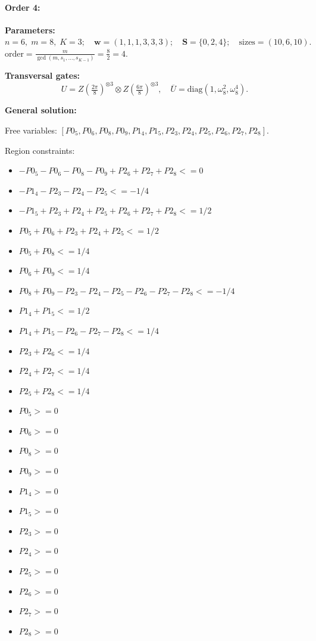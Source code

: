 \documentclass[11pt]{article}
\begin{document}
\paragraph{\textbf{Order 4:}}
\noindent\textbf{Parameters:} $n=6,\; m=8,\; K=3;\quad \mathbf w=(1, 1, 1, 3, 3, 3);\quad \mathbf S=\{0, 2, 4\};\quad \text{sizes}=\left(10, 6, 10\right).$ $\displaystyle \text{order}=\frac{m}{\gcd(m,s_1,\dots,s_{K-1})}=\frac{8}{2}=4.$

\noindent\textbf{Transversal gates:}
\[
    U=Z \left(\tfrac{2\pi}{8}\right)^{\otimes3} \otimes Z \left(\tfrac{6\pi}{8}\right)^{\otimes3},\quad
    \overline U=\mathrm{diag}(1,\omega_8^{2},\omega_8^{4}).
\]

\noindent\textbf{General solution:}

Free variables: $[P0_5, P0_6, P0_8, P0_9, P1_4, P1_5, P2_3, P2_4, P2_5, P2_6, P2_7, P2_8]$.

Region constraints:
\begin{itemize}
    \item $-P0_5 - P0_6 - P0_8 - P0_9 + P2_6 + P2_7 + P2_8 <= 0$
    \item $-P1_4 - P2_3 - P2_4 - P2_5 <= -1/4$
    \item $-P1_5 + P2_3 + P2_4 + P2_5 + P2_6 + P2_7 + P2_8 <= 1/2$
    \item $P0_5 + P0_6 + P2_3 + P2_4 + P2_5 <= 1/2$
    \item $P0_5 + P0_8 <= 1/4$
    \item $P0_6 + P0_9 <= 1/4$
    \item $P0_8 + P0_9 - P2_3 - P2_4 - P2_5 - P2_6 - P2_7 - P2_8 <= -1/4$
    \item $P1_4 + P1_5 <= 1/2$
    \item $P1_4 + P1_5 - P2_6 - P2_7 - P2_8 <= 1/4$
    \item $P2_3 + P2_6 <= 1/4$
    \item $P2_4 + P2_7 <= 1/4$
    \item $P2_5 + P2_8 <= 1/4$
    \item $P0_5 >= 0$
    \item $P0_6 >= 0$
    \item $P0_8 >= 0$
    \item $P0_9 >= 0$
    \item $P1_4 >= 0$
    \item $P1_5 >= 0$
    \item $P2_3 >= 0$
    \item $P2_4 >= 0$
    \item $P2_5 >= 0$
    \item $P2_6 >= 0$
    \item $P2_7 >= 0$
    \item $P2_8 >= 0$
\end{itemize}
\end{document}
